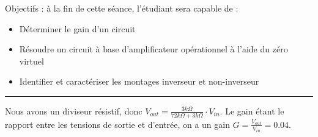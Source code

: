 \documentclass{../template/tp}
\author{The Fantastic Four}
\begin{document}

\vspace{-1cm}
Objectifs : à la fin de cette séance, l'étudiant sera capable de :
\begin{itemize}
\item Déterminer le gain d'un circuit
\item Résoudre un circuit à base d'amplificateur opérationnel à l'aide du zéro virtuel
\item Identifier et caractériser les montages inverseur et non-inverseur
\end{itemize}
\rule{\linewidth}{.5pt}

{Nous avons un diviseur résistif, donc $V_{out} = \frac{3 k\Omega}{72 k\Omega + 3 k\Omega} \cdot V_{in}$.
Le gain étant le rapport entre les tensions de sortie et d'entrée, on a un gain $G = \frac{V_{out}}{V_{in}} = 0.04$.}
\end{document}
